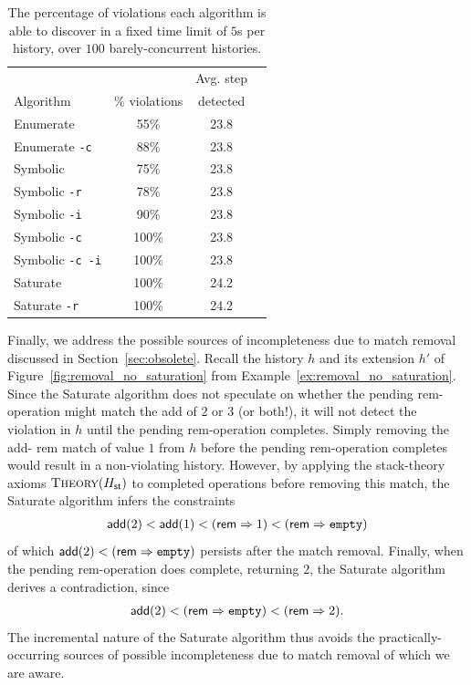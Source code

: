 \begin{table}[t]
  \footnotesize
  \centering
  \setlength{\tabcolsep}{1.8mm}
  \begin{tabular}{lccc}
   	          & 	              & Avg. step \\
    Algorithm & $\%$ violations & detected  \\
    \hline
    {\sc Enumerate}             & 55$\%$  & 23.8 \\
    {\sc Enumerate} {\tt -c}    & 88$\%$  & 23.8 \\
    {\sc Symbolic}              & 75$\%$  & 23.8 \\
    {\sc Symbolic} {\tt -r}     & 78$\%$  & 23.8 \\
    {\sc Symbolic} {\tt -i}     & 90$\%$  & 23.8 \\
    {\sc Symbolic} {\tt -c}     & 100$\%$ & 23.8 \\
    {\sc Symbolic} {\tt -c -i}  & 100$\%$ & 23.8 \\
    {\sc Saturate}              & 100$\%$ & 24.2 \\
    {\sc Saturate} {\tt -r}     & 100$\%$ & 24.2
  \end{tabular} 

  \caption{The percentage of violations each algorithm is able to discover in a
  fixed time limit of $5$s per history, over $100$ barely-concurrent histories.}
  \label{tab:exp:seq}
\end{table}

Finally, we address the possible sources of incompleteness due to match removal
discussed in Section~\ref{sec:obsolete}. Recall the history $h$ and its
extension $h'$ of Figure~\ref{fig:removal_no_saturation} from
Example~\ref{ex:removal_no_saturation}. Since the {\sc Saturate} algorithm does
not speculate on whether the pending {\sf rem}-operation might match the {\sf
add} of $2$ or $3$ (or both!), it will not detect the violation in $h$ until
the pending {\sf rem}-operation completes. Simply removing the {\sf add}-{\sf
rem} match of value $1$ from $h$ before the pending {\sf rem}-operation
completes would result in a non-violating history. However, by applying the
stack-theory axioms $\textsc{Theory}(H_{\sf st})$ to completed operations
before removing this match, the {\sc Saturate} algorithm infers the constraints
\begin{align*}
  {\sf add}(2) < {\sf add}(1) < ({\sf rem} => 1) < ({\sf rem} => {\tt empty})
\end{align*}
of which ${\sf add}(2) < ({\sf rem} => {\tt empty})$ persists after the
match removal. Finally, when the pending {\sf rem}-operation does complete,
returning $2$, the {\sc Saturate} algorithm derives a contradiction, since
\begin{align*}
  {\sf add}(2) < ({\sf rem} => {\tt empty}) < ({\sf rem} => 2).
\end{align*}
The incremental nature of the {\sc Saturate} algorithm thus avoids the
practically-occurring sources of possible incompleteness due to match removal
of which we are aware.
